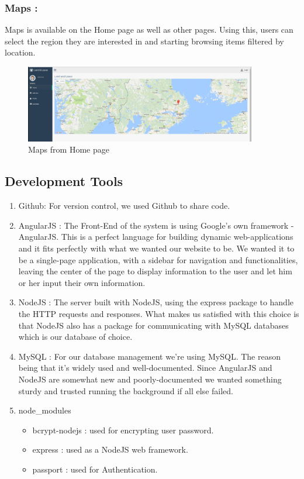 \documentclass[a4paper]{article}
\begin{document}
\subsubsection{Maps :} Maps is available on the Home page as well as other pages. Using this, users can select the region they are interested in and starting browsing items filtered by location. 
\begin{figure}[H] 
  \centering
  \includegraphics[width=0.9\textwidth]{home.PNG}\hfill
  \caption{Maps from Home page}\label{home}
\end{figure}

\subsection{Development Tools}
\begin{enumerate}
\item Github: For version control, we used Github to share code.
\item AngularJS : The Front-End of the system is using Google’s own framework - AngularJS. This is a perfect language for building dynamic web-applications and it fits perfectly with what we wanted our website to be. We wanted it to be a single-page application, with a sidebar for navigation and functionalities, leaving the center of the page to display information to the user and let him or her input their own information. 

\item NodeJS : The server built with NodeJS, using the express package to handle the HTTP requests and responses. What makes us satisfied with this choice is that NodeJS also has a package for communicating with MySQL databases which is our database of choice.

\item MySQL : For our database management we’re using MySQL. The reason being that it’s widely used and well-documented. Since AngularJS and NodeJS are somewhat new and poorly-documented we wanted something sturdy and trusted running the background if all else failed. 
\item node\_modules
\begin{itemize}
\item bcrypt-nodejs : used for encrypting user password. \cite{bcrypt}
\item express : used as a NodeJS web framework. \cite{express}
\item passport : used for Authentication. \cite{authentication}
\end{itemize}
\end{enumerate}
\end{document}
